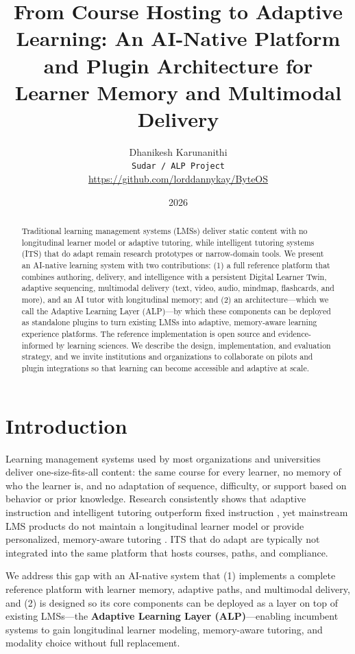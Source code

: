 \documentclass[10pt,twocolumn]{article}
\title{From Course Hosting to Adaptive Learning: An AI-Native Platform and Plugin Architecture for Learner Memory and Multimodal Delivery}
\author{
  Dhanikesh Karunanithi\\
  \texttt{Sudar / ALP Project}\\
  \url{https://github.com/lorddannykay/ByteOS}
}
\date{2026}
\begin{document}
\maketitle

\begin{abstract}
Traditional learning management systems (LMSs) deliver static content with no longitudinal learner model or adaptive tutoring, while intelligent tutoring systems (ITS) that do adapt remain research prototypes or narrow-domain tools. We present an AI-native learning system with two contributions: (1) a full reference platform that combines authoring, delivery, and intelligence with a persistent Digital Learner Twin, adaptive sequencing, multimodal delivery (text, video, audio, mindmap, flashcards, and more), and an AI tutor with longitudinal memory; and (2) an architecture---which we call the Adaptive Learning Layer (ALP)---by which these components can be deployed as standalone plugins to turn existing LMSs into adaptive, memory-aware learning experience platforms. The reference implementation is open source and evidence-informed by learning sciences. We describe the design, implementation, and evaluation strategy, and we invite institutions and organizations to collaborate on pilots and plugin integrations so that learning can become accessible and adaptive at scale.
\end{abstract}

\section{Introduction}
\label{sec:intro}

Learning management systems used by most organizations and universities deliver one-size-fits-all content: the same course for every learner, no memory of who the learner is, and no adaptation of sequence, difficulty, or support based on behavior or prior knowledge. Research consistently shows that adaptive instruction and intelligent tutoring outperform fixed instruction \cite{vanlehn2011,aleven2016}, yet mainstream LMS products do not maintain a longitudinal learner model or provide personalized, memory-aware tutoring \cite{zawacki2019,adnan2023}. ITS that do adapt are typically not integrated into the same platform that hosts courses, paths, and compliance.

We address this gap with an AI-native system that (1) implements a complete reference platform with learner memory, adaptive paths, and multimodal delivery, and (2) is designed so its core components can be deployed as a layer on top of existing LMSs---the \textbf{Adaptive Learning Layer (ALP)}---enabling incumbent systems to gain longitudinal learner modeling, memory-aware tutoring, and modality choice without full replacement.
\end{document}
